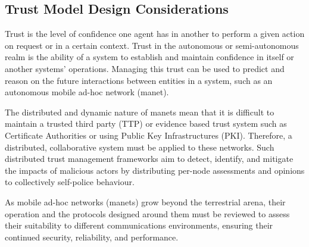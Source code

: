 \subsection{Trust Model Design Considerations}
Trust is the level of confidence one agent has in another to perform a given action on request or in a certain context.
Trust in the autonomous or semi-autonomous realm is the ability of a system to establish and maintain confidence in itself or another systems' operations.
Managing this trust can be used to predict and reason on the future interactions between entities in a system, such as an autonomous mobile ad-hoc network (\gls{manet}).

The distributed and dynamic nature of \gls{manet}s mean that it is difficult to maintain a trusted third party (TTP) or evidence based trust system such as Certificate Authorities or using Public Key Infrastructures (PKI).
Therefore, a distributed, collaborative system must be applied to these networks.
Such distributed trust management frameworks aim to detect, identify, and mitigate the impacts of malicious actors by distributing per-node assessments and opinions to collectively self-police behaviour.

As mobile ad-hoc networks (\gls{manet}s) grow beyond the terrestrial arena, their operation and the protocols designed around them must be reviewed to assess their suitability to different communications environments, ensuring their continued security, reliability, and performance.

